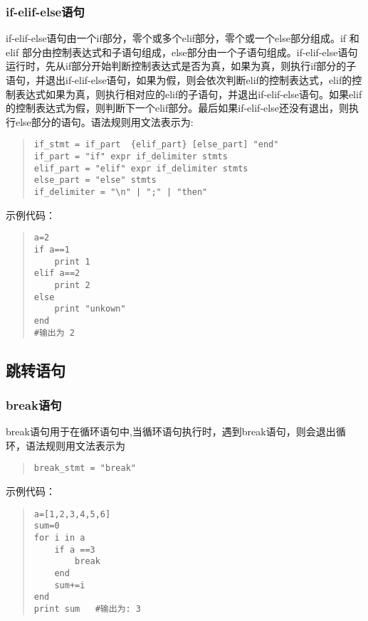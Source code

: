 \subsubsection{if-elif-else语句}
if-elif-else语句由一个if部分，零个或多个elif部分，零个或一个else部分组成。if 和 elif 部分由控制表达式和子语句组成，else部分由一个子语句组成。if-elif-else语句运行时，先从if部分开始判断控制表达式是否为真，如果为真，则执行if部分的子语句，并退出if-elif-else语句，如果为假，则会依次判断elif的控制表达式，elif的控制表达式如果为真，则执行相对应的elif的子语句，并退出if-elif-else语句。如果elif的控制表达式为假，则判断下一个elif部分。最后如果if-elif-else还没有退出，则执行else部分的语句。语法规则用文法表示为:
\begin{quote}
\begin{verbatim}
if_stmt = if_part  {elif_part} [else_part] "end"
if_part = "if" expr if_delimiter stmts 
elif_part = "elif" expr if_delimiter stmts
else_part = "else" stmts
if_delimiter = "\n" | ";" | "then"
\end{verbatim}
\end{quote}
示例代码：
\begin{quote}
\begin{verbatim}
a=2
if a==1
    print 1
elif a==2
    print 2
else 
    print "unkown"
end 
#输出为 2
\end{verbatim}
\end{quote}

\subsection{跳转语句}
\subsubsection{break语句}
break语句用于在循环语句中,当循环语句执行时，遇到break语句，则会退出循环，语法规则用文法表示为
\begin{quote}
\begin{verbatim}
break_stmt = "break" 
\end{verbatim}
\end{quote}
示例代码：
\begin{quote}
\begin{verbatim}
a=[1,2,3,4,5,6] 
sum=0
for i in a
    if a ==3
        break
    end 
    sum+=i
end 
print sum   #输出为: 3
\end{verbatim}
\end{quote}

